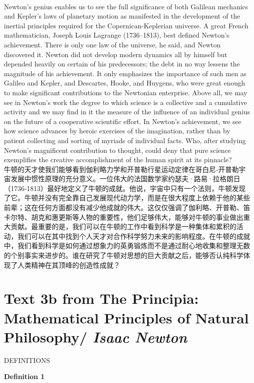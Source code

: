 \documentclass{article}
\begin{document}
\\
Newton's genius enables us to see the full significance of both Galilean mechanics and Kepler's laws of planetary motion as manifested in the development of the inertial principles required for the Copernican-Keplerian universe. A great French mathematician, Joseph Louis Lagrange (1736--1813), best defined Newton's achievement. There is only one law of the universe, he said, and Newton discovered it. Newton did not develop modern dynamics all by himself but depended heavily on certain of his predecessors; the debt in no way lessens the magnitude of his achievement. It only emphasizes the importance of such men as Galileo and Kepler, and Descartes, Hooke, and Huygens, who were great enough to make significant contributions to the Newtonian enterprise. Above all, we may see in Newton's work the degree to which science is a collective and a cumulative activity and we may find in it the measure of the influence of an individual genius on the future of a cooperative scientific effort. In Newton's achievement, we see how science advances by heroic exercises of the imagination, rather than by patient collecting and sorting of myriads of individual facts. Who, after studying Newton's magnificent contribution to thought, could deny that pure science exemplifies the creative accomplishment of the human spirit at its pinnacle?\\
牛顿的天才使我们能够看到伽利略力学和开普勒行星运动定律在哥白尼-开普勒宇宙发展中惯性原理的充分意义。一位伟大的法国数学家约瑟夫·路易·拉格朗日（1736-1813）最好地定义了牛顿的成就。他说，宇宙中只有一个法则，牛顿发现了它。牛顿并没有完全靠自己发展现代动力学，而是在很大程度上依赖于他的某些前辈；这在任何方面都没有减少他成就的伟大。这仅仅强调了伽利略、开普勒、笛卡尔特、胡克和惠更斯等人物的重要性，他们足够伟大，能够对牛顿的事业做出重大贡献。最重要的是，我们可以在牛顿的工作中看到科学是一种集体和累积的活动，我们可以在其中找到个人天才对合作科学努力未来的影响程度。在牛顿的成就中，我们看到科学是如何通过想象力的英勇锻炼而不是通过耐心地收集和整理无数的个别事实来进步的。谁在研究了牛顿对思想的巨大贡献之后，能够否认纯科学体现了人类精神在其顶峰的创造性成就？\\




\newpage
\section{Text 3b from The Principia: Mathematical Principles of Natural Philosophy/ \textit{Isaac Newton}}
\begin{center}
    DEFINITIONS
\end{center}
\noindent\textbf{Definition 1}
\end{document}
